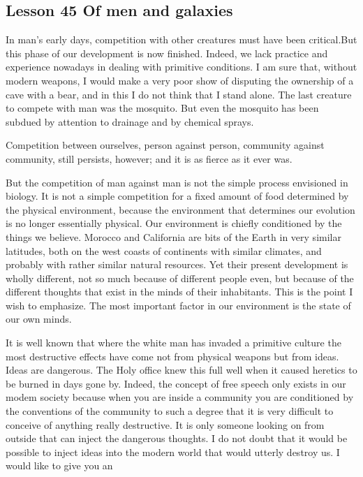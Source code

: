 \documentclass[kindlepaper]{BHCexam4kindle}
\begin{document}
\subsection{Lesson 45
Of men and galaxies}
\par
In man's early days, competition with other creatures must have been critical.But this phase of our
development is now finished. Indeed, we lack practice and experience nowadays in dealing with primitive
conditions. I am sure that, without modern weapons, I would make a very poor show of disputing the
ownership of a cave with a bear, and in this I do not think that I stand alone. The last creature to compete with
man was the mosquito. But even the mosquito has been subdued by attention to drainage and by chemical
sprays.
\par
Competition between ourselves, person against person, community against community, still persists,
however; and it is as fierce as it ever was.
\par
But the competition of man against man is not the simple process envisioned in biology. It is not a simple
competition for a fixed amount of food determined by the physical environment, because the environment that
determines our evolution is no longer essentially physical. Our environment is chiefly conditioned by the
things we believe. Morocco and California are bits of the Earth in very similar latitudes, both on the west
coasts of continents with similar climates, and probably with rather similar natural resources. Yet their present
development is wholly different, not so much because of different people even, but because of the different
thoughts that exist in the minds of their inhabitants. This is the point I wish to emphasize. The most important
factor in our environment is the state of our own minds.
\par
It is well known that where the white man has invaded a primitive culture the most destructive effects
have come not from physical weapons but from ideas. Ideas are dangerous. The Holy office knew this full well
when it caused heretics to be burned in days gone by. Indeed, the concept of free speech only exists in
our modem society because when you are inside a community you are conditioned by the conventions of the
community to such a degree that it is very difficult to conceive of anything really destructive. It is only
someone looking on from outside that can inject the dangerous thoughts. I do not doubt that it would be
possible to inject ideas into the modern world that would utterly destroy us. I would like to give you an
\end{document}
